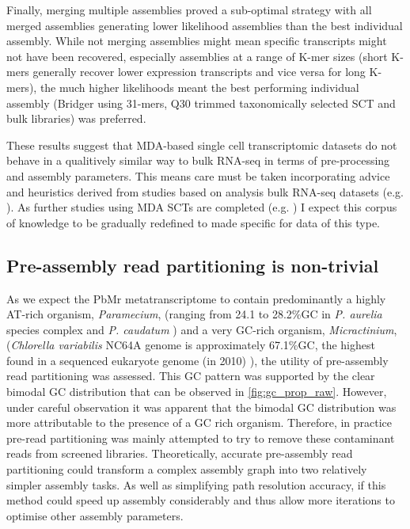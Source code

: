 Finally, merging multiple assemblies proved a sub-optimal strategy with all
merged assemblies generating lower likelihood assemblies than the
best individual assembly.  While not merging assemblies might mean specific
transcripts might not have been recovered, especially assemblies at a range
of K-mer sizes (short K-mers generally recover lower expression transcripts
and vice versa for long K-mers), the much higher likelihoods meant the
best performing individual assembly (Bridger using 31-mers, Q30 trimmed
taxonomically selected SCT and bulk libraries) was preferred.

These results suggest that MDA-based single cell transcriptomic datasets
do not behave in a qualitively similar way to bulk RNA-seq in terms of
pre-processing and assembly parameters.  
This means care must be taken incorporating advice and heuristics
derived from studies based on analysis bulk RNA-seq datasets (e.g. \citep{Macmanes2013,Macmanes2014,Macmanes2015,Nakasugi2014}).
As further studies using MDA SCTs are completed (e.g. \citep{Kolisko2014}) I expect
this corpus of knowledge to be gradually redefined to made specific for data of this type.

\subsection{Pre-assembly read partitioning is non-trivial}

As we expect the PbMr metatranscriptome to contain predominantly a highly AT-rich organism, \textit{Paramecium},
(ranging from 24.1 to 28.2\%GC in \textit{P. aurelia} species complex and \textit{P. caudatum} \citep{Aury2006,McGrath2014})
and a very GC-rich organism, \textit{Micractinium}, (\textit{Chlorella variabilis} NC64A genome is approximately 67.1\%GC, the highest
found in a sequenced eukaryote genome (in 2010) \citep{Blanc2010}), the utility of pre-assembly read partitioning was assessed.
This GC pattern was supported by the clear bimodal GC distribution that can be observed in \cref{fig:gc_prop_raw}.
However, under careful observation it was apparent that the bimodal GC distribution was more attributable to 
the presence of a GC rich organism.  Therefore, in practice pre-read partitioning was mainly attempted to 
try to remove these contaminant reads from screened libraries.
Theoretically, accurate pre-assembly read partitioning could transform a complex assembly graph into two relatively simpler
assembly tasks.  As well as simplifying path resolution accuracy, if this method could
 speed up assembly considerably and thus allow more iterations to optimise other
assembly parameters.

